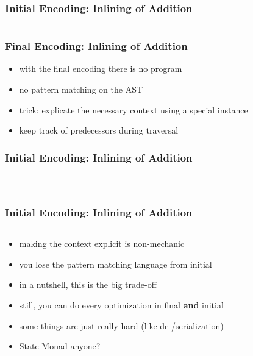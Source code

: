 \documentclass[aspectratio=169, hyperref={colorlinks, linkcolor=beamer@centricgreen}, urlcolor=links]{beamer}
\begin{document}
\begin{frame}[fragile]
  \frametitle{Initial Encoding: Inlining of Addition}
  \inputminted[fontsize=\footnotesize]{scala}{snippets/optimizer-inline-addition.scala}
\end{frame}

\begin{frame}
  \frametitle{Final Encoding: Inlining of Addition}
  \begin{itemize}
  \item with the final encoding there is no program
  \item no pattern matching on the AST
  \item trick: explicate the necessary context using a special instance
  \item keep track of predecessors during traversal
  \end{itemize}
\end{frame}

\begin{frame}[fragile]
  \frametitle{Initial Encoding: Inlining of Addition}
  \inputminted[fontsize=\footnotesize]{scala}{snippets/final-tagless-opt-ctx.scala}
  \vfill{}
  \inputminted[fontsize=\footnotesize]{scala}{snippets/final-tagless-opt-type.scala}
  \vfill{}
  \inputminted[fontsize=\footnotesize]{scala}{snippets/final-tagless-opt-sig.scala}
\end{frame}

\begin{frame}[fragile]
  \frametitle{Initial Encoding: Inlining of Addition}
  \inputminted[fontsize=\footnotesize]{scala}{snippets/final-tagless-opt-impl.scala}
\end{frame}

\begin{frame}[fragile]
  \begin{itemize}
  \item<1> making the context explicit is non-mechanic
  \item<1> you lose the pattern matching language from initial
  \item<1> in a nutshell, this is the big trade-off
  \item<1> still, you can do every optimization in final \textbf{and} initial
  \item<1> some things are just really hard (like de-/serialization)
  \item<2> State Monad anyone?
  \end{itemize}
\end{frame}
\end{document}
